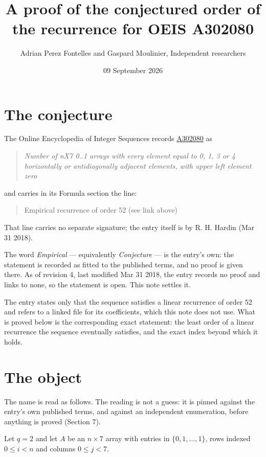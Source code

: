 \documentclass[11pt]{article}
\title{A proof of the conjectured order of the recurrence for OEIS A302080}
\author{Adrian Perez Fontelles and Gaspard Moulinier, Independent researchers}
\date{09 September 2026}
\theoremstyle{definition}
\begin{document}
\maketitle
\section{The conjecture}

The Online Encyclopedia of Integer Sequences records \href{https://oeis.org/A302080}{A302080} as

\begin{quote}\itshape Number of nX7 0..1 arrays with every element equal to 0, 1, 3 or 4 horizontally or antidiagonally adjacent elements, with upper left element zero\end{quote}

and carries in its Formula section the line:

\begin{quote}\ttfamily Empirical recurrence of order 52 (see link above)\end{quote}

That line carries no separate signature; the entry itself is by R. H. Hardin (Mar 31 2018).

The word {\itshape Empirical} --- equivalently {\itshape Conjecture} --- is the entry's own: the statement is recorded as fitted to the published terms, and no proof is given there. As of revision 4, last modified Mar 31 2018, the entry records no proof and links to none, so the statement is open. This note settles it.

The entry states only that the sequence satisfies a linear recurrence of order $52$ and refers to a linked file for its coefficients, which this note does not use. What is proved below is the corresponding exact statement: the least order of a linear recurrence the sequence eventually satisfies, and the exact index beyond which it holds.

\section{The object}

The name is read as follows. The reading is not a guess: it is pinned against the entry's own published terms, and against an independent enumeration, before anything is proved (Section 7).

Let $q = 2$ and let $A$ be an $n \times 7$ array with entries in $\{0,1,\dots,1\}$, rows indexed $0 \le i < n$ and columns $0 \le j < 7$.
\end{document}
